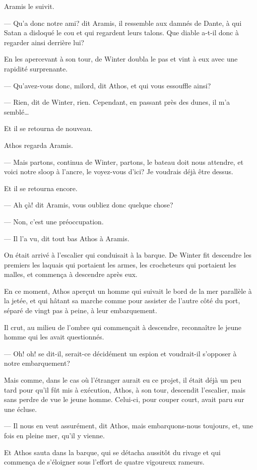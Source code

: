 Aramis le suivit.

— Qu'a donc notre ami? dit Aramis, il ressemble aux damnés de Dante, à qui Satan a disloqué le cou et qui regardent leurs talons. Que diable a-t-il donc à regarder ainsi derrière lui?

En les apercevant à son tour, de Winter doubla le pas et vint à eux avec une rapidité surprenante.

— Qu'avez-vous donc, milord, dit Athos, et qui vous essouffle ainsi?

— Rien, dit de Winter, rien. Cependant, en passant près des dunes, il m'a semblé\dots

Et il se retourna de nouveau.

Athos regarda Aramis.

— Mais partons, continua de Winter, partons, le bateau doit nous attendre, et voici notre sloop à l'ancre, le voyez-vous d'ici? Je voudrais déjà être dessus.

Et il se retourna encore.

— Ah çà! dit Aramis, vous oubliez donc quelque chose?

— Non, c'est une préoccupation.

— Il l'a vu, dit tout bas Athos à Aramis.

On était arrivé à l'escalier qui conduisait à la barque. De Winter fit descendre les premiers les laquais qui portaient les armes, les crocheteurs qui portaient les malles, et commença à descendre après eux.

En ce moment, Athos aperçut un homme qui suivait le bord de la mer parallèle à la jetée, et qui hâtant sa marche comme pour assister de l'autre côté du port, séparé de vingt pas à peine, à leur embarquement.

Il crut, au milieu de l'ombre qui commençait à descendre, reconnaître le jeune homme qui les avait questionnés.

— Oh! oh! se dit-il, serait-ce décidément un espion et voudrait-il s'opposer à notre embarquement?

Mais comme, dans le cas où l'étranger aurait eu ce projet, il était déjà un peu tard pour qu'il fût mis à exécution, Athos, à son tour, descendit l'escalier, mais sans perdre de vue le jeune homme. Celui-ci, pour couper court, avait paru sur une écluse.

— Il nous en veut assurément, dit Athos, mais embarquons-nous toujours, et, une fois en pleine mer, qu'il y vienne.

Et Athos sauta dans la barque, qui se détacha aussitôt du rivage et qui commença de s'éloigner sous l'effort de quatre vigoureux rameurs.

